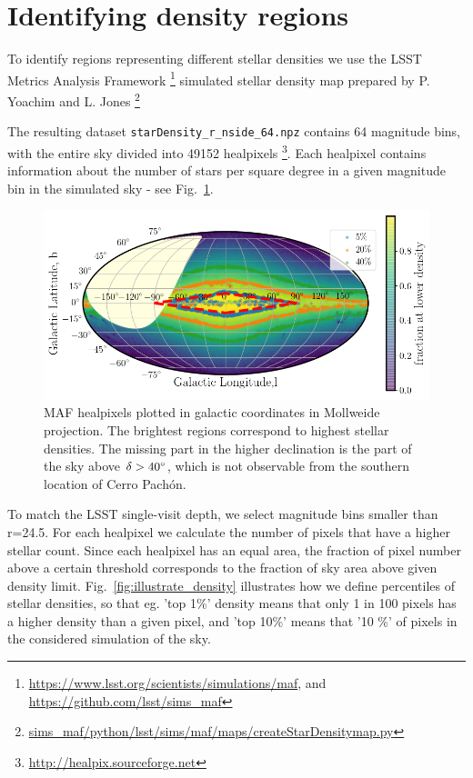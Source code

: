 \documentclass[DM,lsstdraft,toc,usenatbib]{lsstdoc}
\begin{document}
\section{Identifying density regions}
\label{sec:MAF}
To identify regions representing different stellar densities we use the LSST  Metrics Analysis Framework \footnote{\url{https://www.lsst.org/scientists/simulations/maf}, and \url{https://github.com/lsst/sims_maf}} simulated stellar density map prepared by P. Yoachim and L. Jones 
\footnote{\url{sims_maf/python/lsst/sims/maf/maps/createStarDensitymap.py}}

The  resulting dataset \verb|starDensity_r_nside_64.npz| contains 64 magnitude bins, with the entire sky divided into 49152  healpixels \footnote{\url{http://healpix.sourceforge.net}}. Each healpixel contains information about the number of stars per square degree in a given magnitude bin in the simulated sky - see Fig.~\ref{fig:MAF_densities}.

\begin{figure}
\includegraphics[width=1.0\columnwidth]{figs/MAF_densities.png}
\caption{MAF healpixels plotted in galactic coordinates in Mollweide projection. The brightest regions correspond to highest stellar densities. The missing part in the higher declination is the part of the sky above $\delta>40 \degree$, which is not observable from the southern location of Cerro Pach\'on.}
\label{fig:MAF_densities}
\end{figure} 


To match the LSST single-visit depth,  we select magnitude bins smaller than r=24.5.   For each healpixel we calculate the number of pixels that have a higher stellar count.  Since each healpixel has an equal area, the fraction of pixel number above a certain threshold corresponds to the fraction of sky area above given density limit.  Fig.~\ref{fig:illustrate_density} illustrates how we define percentiles of stellar densities, so that eg. 'top 1\%' density means that only 1 in 100 pixels has a higher density than a given pixel, and 'top 10\%' means that '10 \%' of pixels in the considered simulation of the sky. 
\end{document}
